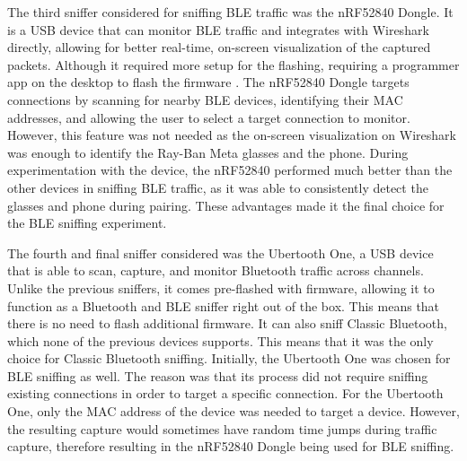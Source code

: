 The third sniffer considered for sniffing BLE traffic was the nRF52840 Dongle. It is a USB device that can monitor BLE traffic and integrates with Wireshark directly, allowing for better real-time, on-screen visualization of the captured packets. Although it required more setup for the flashing, requiring a programmer app on the desktop to flash the firmware \cite{nRF52840firmware}. The nRF52840 Dongle targets connections by scanning for nearby BLE devices, identifying their MAC addresses, and allowing the user to select a target connection to monitor. However, this feature was not needed as the on-screen visualization on Wireshark was enough to identify the Ray-Ban Meta glasses and the phone. During experimentation with the device, the nRF52840 performed much better than the other devices in sniffing BLE traffic, as it was able to consistently detect the glasses and phone during pairing. These advantages made it the final choice for the BLE sniffing experiment.

The fourth and final sniffer considered was the Ubertooth One, a USB device that is able to scan, capture, and monitor Bluetooth traffic across channels. Unlike the previous sniffers, it comes pre-flashed with firmware, allowing it to function as a Bluetooth and BLE sniffer right out of the box. This means that there is no need to flash additional firmware. It can also sniff Classic Bluetooth, which none of the previous devices supports. This means that it was the only choice for Classic Bluetooth sniffing. Initially, the Ubertooth One was chosen for BLE sniffing as well. The reason was that its process did not require sniffing existing connections in order to target a specific connection. For the Ubertooth One, only the MAC address of the device was needed to target a device. However, the resulting capture would sometimes have random time jumps during traffic capture, therefore resulting in the nRF52840 Dongle being used for BLE sniffing.